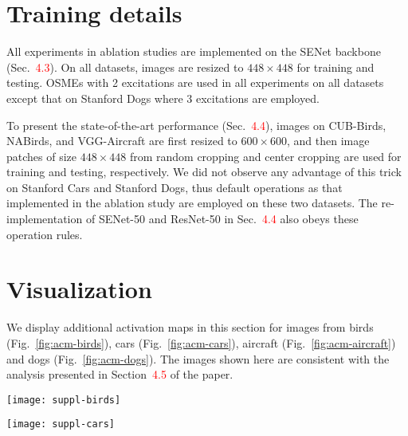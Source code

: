 \documentclass[10pt,twocolumn,letterpaper]{article}
\begin{document}
\section{Training details}
All experiments in ablation studies are implemented on the SENet backbone (Sec.~\textcolor{red}{4.3}). On all datasets, images are resized to $448\times 448$ for training and testing. OSMEs with 2 excitations are used in all experiments on all datasets except that on Stanford Dogs where 3 excitations are employed. 

To present the state-of-the-art performance (Sec.~\textcolor{red}{4.4}), images on CUB-Birds, NABirds, and VGG-Aircraft are first resized to $600\times 600$, and then image patches of size $448\times 448$ from random cropping and center cropping are used for training and testing, respectively. We did not observe any advantage of this trick on Stanford Cars and Stanford Dogs, thus default operations as that implemented in the ablation study are employed on these two datasets. The re-implementation of SENet-50 and ResNet-50 in Sec.~\textcolor{red}{4.4} also obeys these operation rules.

\section{Visualization}
\label{sec:visual}
We display additional activation maps in this section for images from birds (Fig.~\ref{fig:acm-birds}), cars (Fig.~\ref{fig:acm-cars}), aircraft (Fig.~\ref{fig:acm-aircraft}) and dogs (Fig.~\ref{fig:acm-dogs}). The images shown here are consistent with the analysis presented in Section~\textcolor{red}{4.5} of the paper.

\begin{figure*}[h]
\begin{center}
\texttt{[image: suppl-birds]}
\end{center}
\caption{Superimposed display of activation maps (b) $\mathbf{U}_p^{L-1}$, (c) $\mathbf{U}_p^L$ and (d) $\mathbf{U}_p^G$  for images from CUB-Birds. The first column (a) shows original images and the last two columns (e) are combined activation maps from corresponding columns of $\mathbf{U}_p^{L-1}$, $\mathbf{U}_p^L$ and $\mathbf{U}_p^G$ . Each of (b)$\sim$(e) shows the activations of two excitation modules in corresponding layers. Best viewed in color.} 
\label{fig:acm-birds}
\end{figure*}


\begin{figure*}[h]
\begin{center}
\texttt{[image: suppl-cars]}
\end{center}
\caption{Superimposed display of activation maps (b) $\mathbf{U}_p^{L-1}$, (c) $\mathbf{U}_p^L$ and (d) $\mathbf{U}_p^G$  for images from Stanford Cars. The first column (a) shows original images and the last two columns (e) are combined activation maps from corresponding columns of $\mathbf{U}_p^{L-1}$, $\mathbf{U}_p^L$ and $\mathbf{U}_p^G$ . Each of (b)$\sim$(e) shows the activations of two excitation modules in corresponding layers. Best viewed in color.} 
\label{fig:acm-cars}
\end{figure*}
\end{document}
